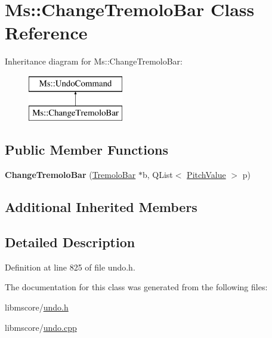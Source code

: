 \hypertarget{class_ms_1_1_change_tremolo_bar}{}\section{Ms\+:\+:Change\+Tremolo\+Bar Class Reference}
\label{class_ms_1_1_change_tremolo_bar}
Inheritance diagram for Ms\+:\+:Change\+Tremolo\+Bar\+:\begin{figure}[H]
\begin{center}
\leavevmode
\includegraphics[height=2.000000cm]{class_ms_1_1_change_tremolo_bar}
\end{center}
\end{figure}
\subsection*{Public Member Functions}
\begin{DoxyCompactItemize}
\item 
\mbox{\label{class_ms_1_1_change_tremolo_bar_a8d53a0e2d9a797b1a4c55cc56859bdc8}} 
{\bfseries Change\+Tremolo\+Bar} (\hyperlink{class_ms_1_1_tremolo_bar}{Tremolo\+Bar} $\ast$b, Q\+List$<$ \hyperlink{struct_ms_1_1_pitch_value}{Pitch\+Value} $>$ p)
\end{DoxyCompactItemize}
\subsection*{Additional Inherited Members}


\subsection{Detailed Description}


Definition at line 825 of file undo.\+h.



The documentation for this class was generated from the following files\+:\begin{DoxyCompactItemize}
\item 
libmscore/\hyperlink{undo_8h}{undo.\+h}\item 
libmscore/\hyperlink{undo_8cpp}{undo.\+cpp}\end{DoxyCompactItemize}
